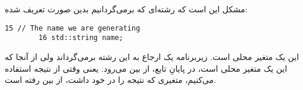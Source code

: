 \section{}
\paragraph{}\label{answer:36}
مشکل این است که رشته‌ای که برمی‌گردانیم بدین صورت تعریف شده:
\begin{LTR}
    \begin{lstlisting}[style=C++Style]
        15 // The name we are generating
        16 std::string name;
    \end{lstlisting}
\end{LTR}

این یک متغیر محلی است. زیربرنامه یک ارجاع به این رشته برمی‌گرداند ولی از آنجا که این یک متغیر محلی است، در پایانِ تابع، از بین می‌رود. یعنی وقتی از نتیجه استفاده می‌کنیم، متغیری که نتیجه را در خود داشت، از بین رفته است.